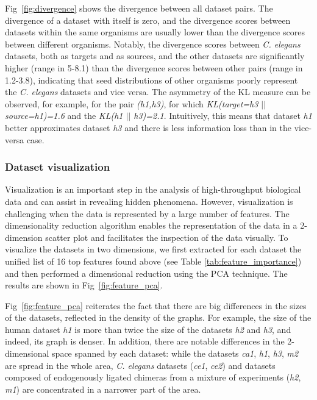 \documentclass{bmcart}
\begin{document}
Fig~\ref{fig:divergence} shows the divergence between all dataset pairs. The divergence of a dataset with itself is zero, and the divergence scores between datasets within the same organisms are usually lower than the divergence scores between different organisms. Notably, the divergence scores between \textit{C. elegans} datasets, both as targets and as sources, and the other datasets are significantly higher (range in 5-8.1) than the divergence scores between other pairs (range in 1.2-3.8), indicating that seed distributions of other organisms poorly represent the \textit{C. elegans} datasets and vice versa. The asymmetry of the KL measure can be observed, for example, for the pair \textit{(h1,h3)}, for which \textit{KL(target=h3 $||$ source=h1)=1.6} and the  \textit{KL(h1 $||$ h3)=2.1}. Intuitively, this means that dataset \textit{h1} better approximates dataset \textit{h3} and there is less information loss than in the vice-versa case.


\subsubsection*{Dataset visualization}
Visualization is an important step in the analysis of high-throughput biological data and can assist in revealing hidden phenomena. However, visualization is challenging when the data is represented by a large number of features. The dimensionality reduction algorithm enables the representation of the data in a 2-dimension scatter plot and facilitates the inspection of the data visually. To visualize the datasets in two dimensions, we first extracted for each dataset the unified list of 16 top features found above (see Table \ref{tab:feature_importance}) and then performed a dimensional reduction using the PCA technique. The results are shown in Fig~\ref{fig:feature_pca}.


Fig~\ref{fig:feature_pca} reiterates the fact that there are big differences in the sizes of the datasets, reflected in the density of the graphs. For example, the size of the human dataset \textit{h1} is more than twice the size of the datasets \textit{h2} and \textit{h3}, and indeed, its graph is denser. In addition, there are notable differences in the 2-dimensional space spanned by each dataset: while the datasets \textit{ca1}, \textit{h1}, \textit{h3}, \textit{m2} are spread in the whole area, \textit{C. elegans} datasets (\textit{ce1}, \textit{ce2}) and datasets composed of endogenously ligated chimeras from a mixture of experiments (\textit{h2}, \textit{m1}) are concentrated in a narrower part of the area.
\end{document}
